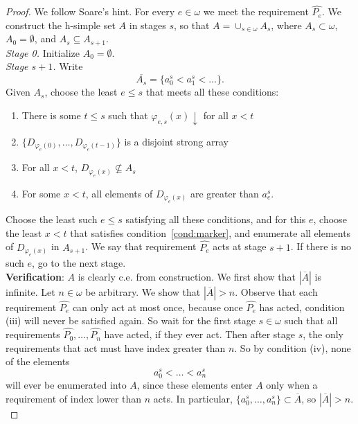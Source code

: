 \documentclass{article}
\begin{document}
  \begin{proof}
    We follow Soare's hint. For every $e\in\omega$ we meet the requirement
    $\hat{P_e}$. We construct the h-simple set $A$ in stages $s$, so that
    $A=\cup_{s\in\omega} A_s$, where $A_s\subset\omega$, $A_0=\emptyset$,
    and $A_s\subseteq A_{s+1}$. \\

    \textit{Stage 0.} Initialize $A_0=\emptyset$. \\

    \textit{Stage $s+1$.} Write
    \[\overline{A_s}=\{a_0^s<a_1^s<\ldots\}.\]
    Given $A_s$, choose the least $e\leq s$ that meets all these
    conditions:

    \begin{enumerate}[label={(\roman*)}]
      \item There is some $t\leq s$ such that $\varphi_{e,s}(x)\downarrow$
        for all $x<t$
      \item $\{D_{\varphi_{e}(0)}, \ldots, D_{\varphi_{e}(t-1)}\}$ is a
        disjoint strong array
      \item For all $x<t$, $D_{\varphi_{e}(x)}\not\subseteq A_s$
      \item For some $x<t$, all elements of $D_{\varphi_{e}(x)}$ are
        greater than $a_e^s$.
        \label{cond:marker}
    \end{enumerate}

    Choose the least such $e\leq s$ satisfying all these conditions, and
    for this $e$, choose the least $x<t$ that satisfies
    condition~\ref{cond:marker}, and enumerate all elements of
    $D_{\varphi_{e}(x)}$ in $A_{s+1}$. We say that requirement $\hat{P_e}$
    acts at stage $s+1$. If there is no such $e$, go to the next stage. \\

    \textbf{Verification}: $A$ is clearly c.e. from construction. We first
    show that $|\overline{A}|$ is infinite. Let $n\in\omega$ be arbitrary.
    We show that $|\overline{A}|>n$. Observe that each requirement
    $\hat{P_e}$ can only act at most once, because once $\hat{P_e}$ has
    acted, condition (iii) will never be satisfied again. So wait for the
    first stage $s\in\omega$ such that all requirements
    $\hat{P_0},\ldots,\hat{P_{n}}$ have acted, if they ever act. Then after
    stage $s$, the only requirements that act must have index greater than
    $n$. So by condition (iv), none of the elements
    \[a_0^s<\ldots<a_n^s\]
    will ever be enumerated into $A$, since these elements enter $A$ only
    when a requirement of index lower than $n$ acts. In particular,
    $\{a_0^s,\ldots,a_n^s\} \subset \overline{A}$, so $|\overline{A}|>n$.
    \\


\end{proof}
\end{document}
